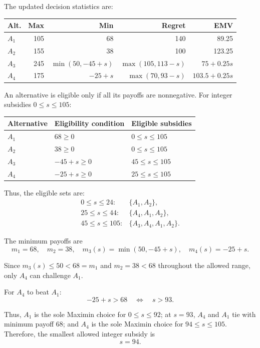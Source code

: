 The updated decision statistics are:

\begin{center}\small\setlength{\tabcolsep}{4pt}
	\begin{tabular}{lrrrr}\toprule
		Alt. & Max & Min & Regret & EMV\\ \midrule
				$A_1$ & 105 & 68 & 140 & 89.25\\
		$A_2$ & 155 & 38 & 100 & 123.25\\
		$A_3$ & 245 & $\min(50,-45+s)$ & $\max(105,113-s)$ & $75+0.25s$\\
		$A_4$ & 175 & $-25+s$ & $\max(70,93-s)$ & $103.5+0.25s$\\
		\bottomrule
	\end{tabular}
\end{center}

An alternative is eligible only if all its payoffs are nonnegative.
For integer subsidies $0\le s\le105$:

\begin{center}
\begin{tabular}{lll}\toprule
Alternative & Eligibility condition & Eligible subsidies\\\midrule
$A_1$ & $68\ge0$ & $0\le s\le105$\\
$A_2$ & $38\ge0$ & $0\le s\le105$\\
$A_3$ & $-45+s\ge0$ & $45\le s\le105$\\
$A_4$ & $-25+s\ge0$ & $25\le s\le105$\\
\bottomrule
\end{tabular}
\end{center}

Thus, the eligible sets are:
\[
\begin{array}{ll}
0\le s\le24: & \{A_1,A_2\},\\
25\le s\le44: & \{A_4,A_1,A_2\},\\
45\le s\le105: & \{A_3,A_4,A_1,A_2\}.
\end{array}
\]

The minimum payoffs are
\[
m_1=68,\quad m_2=38,\quad
m_3(s)=\min(50,-45+s),\quad m_4(s)=-25+s.
\]

Since $m_3(s)\le50<68=m_1$ and $m_2=38<68$ throughout
the allowed range, only $A_4$ can challenge $A_1$.

For $A_4$ to beat $A_1$:
\[
-25+s>68
\quad\Longleftrightarrow\quad s>93.
\]

Thus, $A_1$ is the sole Maximin choice for $0\le s\le92$;
at $s=93$, $A_4$ and $A_1$ tie with minimum payoff 68;
and $A_4$ is the sole Maximin choice for $94\le s\le105$.
Therefore, the smallest allowed integer subsidy is
\[
\boxed{s=94}.
\]

